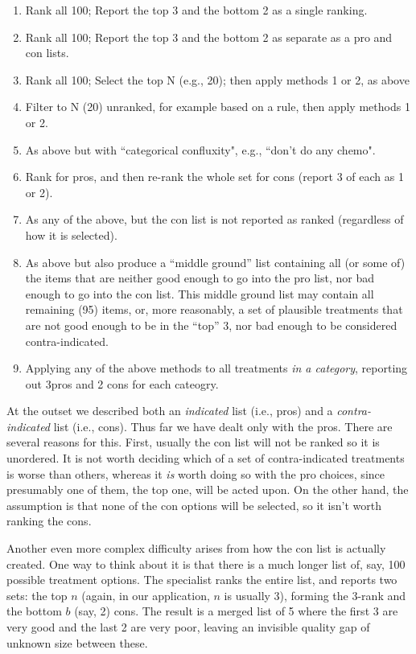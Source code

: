 \documentclass{article}
\begin{document}
\singlespacing
\begin{enumerate}
\item Rank all 100; Report the top 3 and the bottom 2 as a single ranking.
\item Rank all 100; Report the top 3 and the bottom 2 as separate as a pro and con lists.
\item Rank all 100; Select the top N (e.g., 20); then apply methods 1 or 2, as above
\item Filter to N (20) unranked, for example based on a rule, then apply methods 1 or 2.
\item As above but with ``categorical confluxity", e.g., ``don't do any chemo".
\item Rank for pros, and then re-rank the whole set for cons (report 3 of each as 1 or 2).
\item As any of the above, but the con list is not reported as ranked (regardless of how it is selected). 
\item As above but also produce a ``middle ground'' list containing all (or some of) the items that are neither good enough to go into the pro list, nor bad enough to go into the con list. This middle ground list may contain all remaining (95) items, or, more reasonably, a set of plausible treatments that are not good enough to be in the ``top'' 3, nor bad enough to be considered contra-indicated. 
\item Applying any of the above methods to all  treatments \emph{in a category}, reporting out 3pros and 2 cons for each cateogry.
\end{enumerate}
\doublespacing

At the outset we described both an \emph{indicated} list (i.e., pros) and a \emph{contra-indicated} list (i.e., cons). Thus far we have dealt only with the pros. There are several reasons for this. First, usually the con list will not be ranked so it is unordered. It is not worth deciding which of a set of contra-indicated treatments is worse than others, whereas it \textit{is} worth doing so with the pro choices, since presumably one of them, the top one, will be acted upon. On the other hand, the assumption is that none of the con options will be selected, so it isn't worth ranking the cons. 

Another even more complex difficulty arises from how the con list is actually created. One way to think about it is that there is a much longer list of, say, 100  possible treatment options. The specialist ranks the entire list, and reports two sets: the top $n$ (again, in our application, $n$ is usually 3), forming the 3-rank and the bottom $b$ (say, 2) cons. The result is a merged list of 5 where the first 3 are very good and the last 2 are very poor, leaving an invisible quality gap of unknown size between these. 
\end{document}
